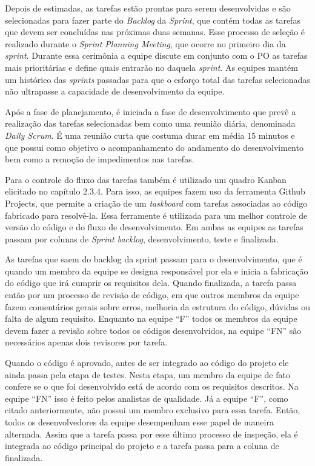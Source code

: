 \documentclass[
    12pt,       %
    openright,      %
    twoside,      %
    a4paper,      %
    english,      %
    french,       %
    spanish,      %
    brazil,       %
    ]{abntex2}
\begin{document}
Depois de estimadas, as tarefas estão prontas para serem desenvolvidas e são selecionadas para fazer parte do \textit{Backlog} da \textit{Sprint}, que contém todas as tarefas que devem ser concluídas nas próximas duas semanas. Esse processo de seleção é realizado durante o \textit{Sprint Planning Meeting}, que ocorre no primeiro dia da \textit{sprint}. Durante essa cerimônia a equipe discute em conjunto com o PO as tarefas mais prioritárias e define quais entrarão no  daquela \textit{sprint}. As equipes mantém um histórico das \textit{sprints} passadas para que o esforço total das tarefas selecionadas não ultrapasse a capacidade de desenvolvimento da equipe. 

Após a fase de planejamento, é iniciada a fase de desenvolvimento que prevê a realização das tarefas selecionadas bem como uma reunião diária, denominada \textit{Daily Scrum}. É uma reunião curta que costuma durar em média 15 minutos e que possui como objetivo o acompanhamento do andamento do desenvolvimento bem como a remoção de impedimentos nas tarefas.

Para o controle do fluxo das tarefas também é utilizado um quadro Kanban elicitado no capítulo 2.3.4. Para isso, as equipes fazem uso da ferramenta Github Projects, que permite a criação de um \textit{taskboard} com tarefas associadas ao código fabricado para resolvê-la. Essa ferramente é utilizada para um melhor controle de versão do código e do fluxo de desenvolvimento. Em ambas as equipes as tarefas passam por colunas de \textit{Sprint backlog}, desenvolvimento, teste e finalizada.

As tarefas que saem do backlog da sprint passam para o desenvolvimento, que é quando um membro da equipe se designa responsável por ela e inicia a fabricação do código que irá cumprir os requisitos dela. Quando finalizada, a tarefa passa então por um processo de revisão de código, em que outros membros da equipe fazem comentários gerais sobre erros, melhoria da estrutura do código, dúvidas ou falta de algum requisito. Enquanto na equipe ``F'' todos os membros da equipe devem fazer a revisão sobre todos os códigos desenvolvidos, na equipe ``FN'' são necessários apenas dois revisores por tarefa.

Quando o código é aprovado, antes de ser integrado ao código do projeto ele ainda passa pela etapa de testes. Nesta etapa, um membro da equipe de fato confere se o que foi desenvolvido está de acordo com os requisitos descritos. Na equipe ``FN'' isso é feito pelos analistas de qualidade. Já a equipe ``F'', como citado anteriormente, não possui um membro exclusivo para essa tarefa. Então, todos os desenvolvedores da equipe desempenham esse papel de maneira alternada. Assim que a tarefa passa por esse último processo de inspeção, ela é integrada ao código principal do projeto e a tarefa passa para a coluna de finalizada. 
\end{document}
